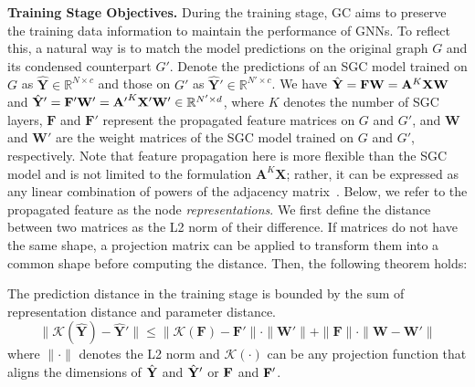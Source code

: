 \textbf{Training Stage Objectives.} 
During the training stage, GC aims to preserve the training data information to maintain the performance of GNNs. To reflect this, a natural way is to match the model predictions on the original graph $G$ and its condensed counterpart $G'$. Denote the predictions of an SGC model trained on $G$ as $\hat{\mathbf{Y}}\in\mathbb{R}^{N \times c}$ and those on $G'$ as $\hat{\mathbf{Y}}'\in\mathbb{R}^{N' \times c}$. We have
$\hat{\mathbf{Y}} = \mathbf{F} \mathbf{W}=\mathbf{A}^K \mathbf{X} {\bf W}$ and $\hat{\mathbf{Y}}' = \mathbf{F}' \mathbf{W}'= {\mathbf{A}'}^K \mathbf{X}'{\bf W}' \in \mathbb{R}^{N' \times d}$,
where $K$ denotes the number of SGC layers, $ \mathbf{F}$ and $\mathbf{F}'$ represent the propagated feature matrices on $G$ and $G'$, and $ \mathbf{W}$ and $\mathbf{W}'$ are the weight matrices of the SGC model trained on $G$ and $G'$, respectively. 
Note that feature propagation here is more flexible than the SGC model and is not limited to the formulation \( \mathbf{A}^K \mathbf{X} \); rather, it can be expressed as any linear combination of powers of the adjacency matrix~\cite{maurya2022fsgnn}. Below, we refer to the propagated feature as the node \textit{representations}.  {We first define the distance between two matrices as the L2 norm of their difference. If matrices do not have the same shape, a projection matrix can be applied to transform them into a common shape before computing the distance.}
Then, the following theorem holds:
\begin{theorem}    \label{theo:training_stage}
    The prediction distance in the training stage is bounded by the sum of representation distance and parameter distance.
    \begin{equation}
    \| \mathcal{K}(\hat{\mathbf{Y}}) - \hat{\mathbf{Y}}' \| 
    \leq  \| \mathcal{K}(\mathbf{F}) - \mathbf{F}' \| \cdot \| \mathbf{W}' \| + \| \mathbf{F} \| \cdot \| \mathbf{W} - \mathbf{W}' \|
    \end{equation}
    where $\|\cdot\|$ denotes the L2 norm and $\mathcal{K}(\cdot)$ can be any projection function that aligns the dimensions of $\hat{{\bf Y}}$ and $\hat{{\bf Y}}'$ or ${\bf F}$ and ${\bf F}'$.

\end{theorem}
